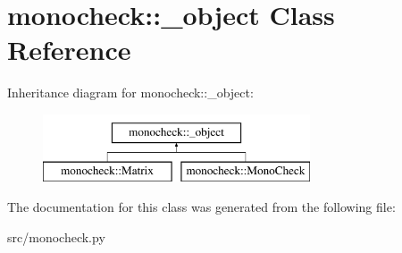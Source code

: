 \hypertarget{classmonocheck_1_1__object}{
\section{monocheck::\_\-object Class Reference}
\label{d8/dec/classmonocheck_1_1__object}
}
Inheritance diagram for monocheck::\_\-object:\begin{figure}[H]
\begin{center}
\leavevmode
\includegraphics[height=2cm]{d8/dec/classmonocheck_1_1__object}
\end{center}
\end{figure}


The documentation for this class was generated from the following file:\begin{DoxyCompactItemize}
\item 
src/monocheck.py\end{DoxyCompactItemize}
